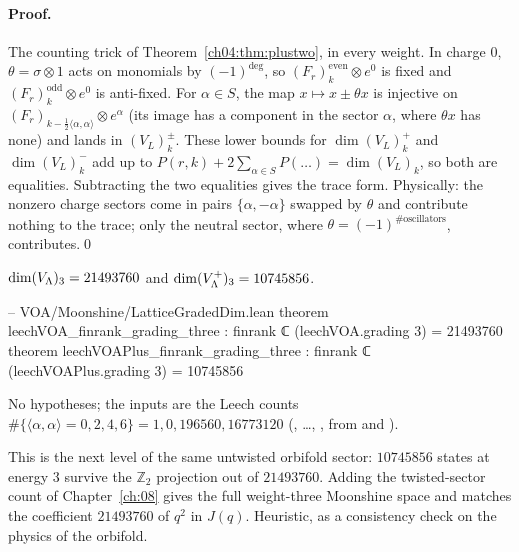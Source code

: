 \paragraph{Proof.} The counting trick of Theorem~\ref{ch04:thm:plustwo}, in every weight. In charge
$0$, $\theta=\sigma\otimes1$ acts on monomials by $(-1)^{\deg}$, so $(F_r)_k^{\mathrm{even}}\otimes e^0$
is fixed and $(F_r)_k^{\mathrm{odd}}\otimes e^0$ is anti-fixed. For $\alpha\in S$, the map
$x\mapsto x\pm\theta x$ is injective on $(F_r)_{k-\frac12\langle\alpha,\alpha\rangle}\otimes e^\alpha$ (its image
has a component in the sector $\alpha$, where $\theta x$ has none) and lands in $(V_L)^\pm_k$. These
lower bounds for $\dim(V_L)^+_k$ and $\dim(V_L)^-_k$ add up to $P(r,k)+2\sum_{\alpha\in S}P(\dots)=\dim(V_L)_k$,
so both are equalities. Subtracting the two equalities gives the trace form. Physically: the
nonzero charge sectors come in pairs $\{\alpha,-\alpha\}$ swapped by $\theta$ and contribute nothing to
the trace; only the neutral sector, where $\theta=(-1)^{\#\text{oscillators}}$, contributes.\qed

\begin{theorem}\label{ch04:thm:wt3}
$\dim(V_{\Lambda})_3=21493760$ and $\dim(V_{\Lambda}^+)_3=10745856$.
\end{theorem}

\begin{leancode}
-- VOA/Moonshine/LatticeGradedDim.lean
theorem leechVOA_finrank_grading_three : finrank ℂ (leechVOA.grading 3) = 21493760
theorem leechVOAPlus_finrank_grading_three : finrank ℂ (leechVOAPlus.grading 3) = 10745856
\end{leancode}

\begin{dictionary}
No hypotheses; the inputs are the Leech counts $\#\{\langle\alpha,\alpha\rangle=0,2,4,6\}=1,0,196560,16773120$
(, \dots, , from
 and ).
\end{dictionary}

\begin{physics}
This is the next level of the same untwisted orbifold sector: $10745856$ states at energy $3$ survive the $\mathbb Z_2$ projection out of $21493760$. Adding the twisted-sector count of Chapter~\ref{ch:08} gives the full weight-three Moonshine space and matches the coefficient $21493760$ of $q^2$ in $J(q)$. Heuristic, as a consistency check on the physics of the orbifold.
\end{physics}

